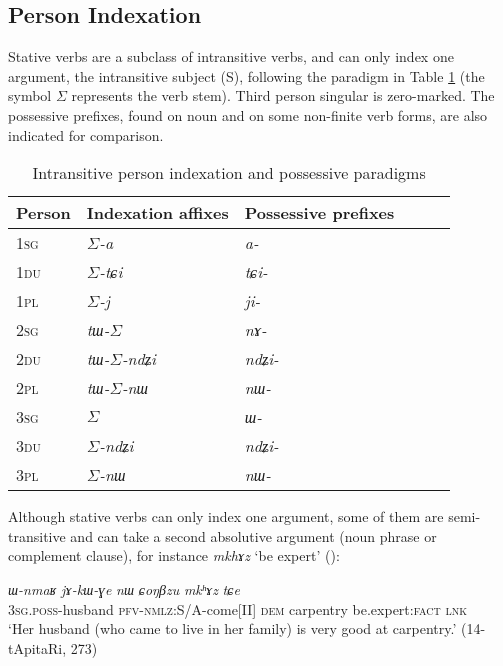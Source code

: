 \documentclass[oldfontcommands,oneside,a4paper,11pt]{article}
\newcommand{\ipa}[1]{{\phon\textit{#1}}} %
\newcommand{\ro}{$\Sigma$}
\begin{document}
\subsection{Person Indexation}
Stative verbs are a subclass of intransitive verbs, and can only index one argument, the intransitive subject (S), following the paradigm in Table \ref{tab:indexation} (the symbol \ro{} represents the verb stem). Third person singular is zero-marked. The possessive prefixes, found on noun and on some non-finite verb forms, are also indicated for comparison.


\begin{table}[H]
\caption{Intransitive person indexation and possessive paradigms} \label{tab:indexation} \centering
\begin{tabular}{llllll}
\toprule 
Person & Indexation affixes & Possessive prefixes \\
\midrule
\textsc{1sg} & \ro{}\ipa{-a} & \ipa{a-} \\
\textsc{1du} & \ro{}\ipa{-tɕi} & \ipa{tɕi-} \\
\textsc{1pl} & \ro{}\ipa{-j} & \ipa{ji-} \\
\midrule
\textsc{2sg} & \ipa{tɯ-}\ro{} & \ipa{nɤ-} \\
\textsc{2du} & \ipa{tɯ-}\ro{}\ipa{-ndʑi} &\ipa{ndʑi-}\\
\textsc{2pl} & \ipa{tɯ-}\ro{}\ipa{-nɯ} & \ipa{nɯ-}\\
\midrule
\textsc{3sg} & \ro{} & \ipa{ɯ-} \\
\textsc{3du} & \ro{}\ipa{-ndʑi} & \ipa{ndʑi-}\\
\textsc{3pl} & \ro{}\ipa{-nɯ} &\ipa{nɯ-}  \\
\bottomrule
\end{tabular}
\end{table}

Although stative verbs can only index one argument, some of them are semi-transitive and can take a second absolutive argument (noun phrase or complement clause), for instance \ipa{mkhɤz} `be expert' (\citealt[275]{jacques16complementation}):

\begin{exe}
\ex \label{ex:CoNBzu.mkhAz}
\gll 
\ipa{ɯ-nmaʁ} 	\ipa{jɤ-kɯ-ɣe} 	\ipa{nɯ} 	\ipa{ɕoŋβzu} 	\ipa{mkʰɤz} 	\ipa{tɕe} \\
\textsc{3sg.poss}-husband \textsc{pfv-nmlz}:S/A-come[II] \textsc{dem} carpentry be.expert:\textsc{fact} \textsc{lnk} \\
\glt `Her husband (who came to live in her family) is very good at carpentry.' (14-tApitaRi, 273)
\end{exe}
\end{document}
